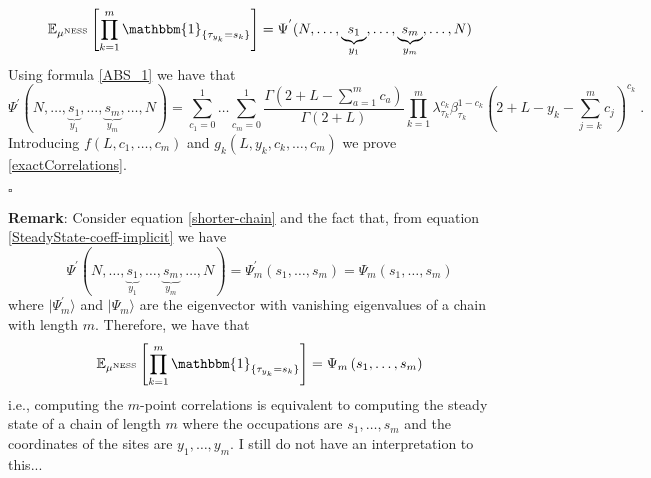 \documentclass[10pt]{article}
\numberwithin{equation}{section}
\numberwithin{equation}{subsection}
\newcommand{\dt}{\;.}
\begin{document}
{\begin{equation}
\mathbb{E}_{\mu^{\text{NESS}}}\left[\prod_{k=1}^{m}\mathbbm{1}_{\{\tau_{y_{k}}=s_{k}\}}\right]=\Psi^{'}(N,\ldots,\underbrace{s_{1}}_{y_{1}},\ldots,\underbrace{s_{m}}_{y_{m}},\ldots,N)
\end{equation}
Using formula \eqref{ABS_1} we have that 
\begin{equation}
 \Psi^{'}(N,\ldots,\underbrace{s_{1}}_{y_{1}},\ldots,\underbrace{s_{m}}_{y_{m}},\ldots,N)=\sum_{c_{1}=0}^{1}\ldots\sum_{c_{m}=0}^{1}\frac{\Gamma(2+L-\sum_{a=1}^{m}c_{a})}{\Gamma(2+L)}\prod_{k=1}^{m}\lambda_{\tau_{k}}^{c_{k}}\beta_{\tau_{k}}^{1-c_{k}}\left(2+L-y_{k}-\sum_{j=k}^{m}c_{j}\right)^{c_{k}}\dt
\end{equation}
Introducing $f(L,c_{1},\ldots,c_{m})$ and $g_{k}(L,y_{k},c_{k},\ldots,c_{m})$ we prove \eqref{exactCorrelations}.
\begin{flushright}
	$\square$
\end{flushright}
}
{\color{blue}
\textbf{Remark}: Consider equation \eqref{shorter-chain} and the fact that, from equation \eqref{SteadyState-coeff-implicit} we have  
\begin{equation}
\Psi^{'}(N,\ldots,\underbrace{s_{1}}_{y_{1}},\ldots,\underbrace{s_{m}}_{y_{m}},\ldots,N)=\Psi_{m}^{'}\left(s_{1},\ldots,s_{m}\right)=\Psi_{m}\left(s_{1},\ldots,s_{m}\right)
\end{equation}
where $|\Psi_{m}^{'}\rangle$ and $|\Psi_{m}\rangle$ are the eigenvector with vanishing eigenvalues of a chain with length $m$. Therefore, we have that 
\begin{equation}
\mathbb{E}_{\mu^{\text{NESS}}}\left[\prod_{k=1}^{m}\mathbbm{1}_{\{\tau_{y_{k}}=s_{k}\}}\right]=\Psi_{m}\left(s_{1},\ldots,s_{m}\right)
\end{equation}
i.e., computing the $m$-point correlations is equivalent to computing the steady state of a chain of length $m$ where the occupations are $s_{1},\ldots,s_{m}$ and the coordinates of the sites are $y_{1},\ldots,y_{m}$. I still do not have an interpretation to this...
}
\end{document}
